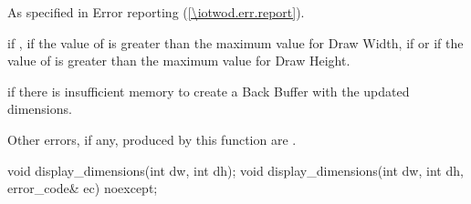 \begin{itemdescr}
\pnum
\throws
As specified in Error reporting (\ref{\iotwod.err.report}).

\pnum
\errors
{} if , if the value of  is greater than the maximum value for Draw Width, if  or if the value of  is greater than the maximum value for Draw Height.

 if there is insufficient memory to create a Back Buffer with the updated dimensions.

Other errors, if any, produced by this function are .
\end{itemdescr}

\begin{itemdecl}
void display_dimensions(int dw, int dh);
void display_dimensions(int dw, int dh, error_code& ec) noexcept;
\end{itemdecl}
